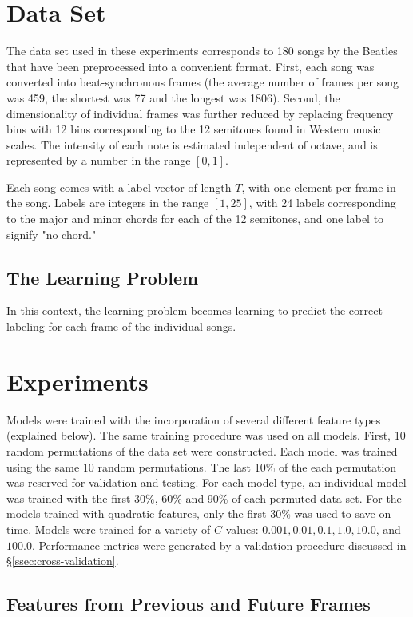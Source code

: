 \section{Data Set}

The data set used in these experiments corresponds to 180 songs by the Beatles
that have been preprocessed into a convenient format. First, each song was
converted into beat-synchronous frames (the average number of frames per song
was 459, the shortest was 77 and the longest was 1806). Second, the
dimensionality of individual frames was further reduced by replacing frequency
bins with 12 bins corresponding to the 12 semitones found in Western music
scales. The intensity of each note is estimated independent of octave, and is
represented by a number in the range $[0, 1]$.

Each song comes with a label vector of length $T$, with one element per frame
in the song.  Labels are integers in the range $[1,25]$, with 24 labels
corresponding to the major and minor chords for each of the 12 semitones, and
one label to signify "no chord."

\subsection{The Learning Problem}

In this context, the learning problem becomes learning to predict the correct
labeling for each frame of the individual songs.


\section{Experiments}

Models were trained with the incorporation of several different feature types
(explained below). The same training procedure was used on all models. First,
10 random permutations of the data set were constructed. Each model was trained
using the same 10 random permutations. The last 10\% of the each permutation
was reserved for validation and testing. For each model type, an individual
model was trained with the first 30\%, 60\% and 90\% of each permuted data set.
For the models trained with quadratic features, only the first 30\% was used to
save on time. Models were trained for a variety of $C$ values: $0.001, 0.01,
0.1, 1.0, 10.0$, and $100.0$. Performance metrics were generated by a validation
procedure discussed in \S \ref{ssec:cross-validation}.

\subsection{Features from Previous and Future Frames}

